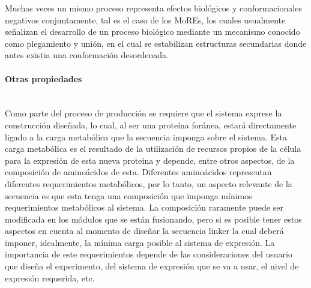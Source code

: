 Muchas veces un mismo proceso representa efectos biológicos y conformacionales negativos conjuntamente, tal es el caso de los MoREs, los cuales usualmente señalizan 
el desarrollo de un proceso biológico mediante un mecanismo conocido como plegamiento y unión, en el cual se estabilizan estructuras secundarias donde antes existia una conformación desordenada.



\paragraph{Otras propiedades} \hspace{0pt} \\ \indent 
Como parte del proceso de producción se requiere que el sistema exprese la construcción diseñada, lo cual, al ser una proteína foránea, estará directamente ligado a la carga
metabólica que la secuencia imponga sobre el sistema\cite{glick1995metabolic}. Esta carga metabólica es el resultado de la utilización de recursos propios de la célula para la expresión de esta nueva proteína y depende, entre otros aspectos, 
de la composición de aminoácidos de esta. 
Diferentes aminoácidos representan diferentes requerimientos metabólicos, por lo tanto, un aspecto relevante de la secuencia es que esta tenga una composición que imponga mínimos requerimientos metabólicos al sistema. 
La composición raramente puede ser modificada en los módulos que se están fusionando, pero si es posible tener estos aspectos en cuenta al momento de diseñar la secuencia linker la cual deberá imponer, idealmente, 
la mínima carga posible al sistema de expresión. La importancia de este requerimientos depende de las consideraciones del usuario que diseña el experimento, del sistema de expresión que se va a usar, el nivel de expresión requerida, etc.


